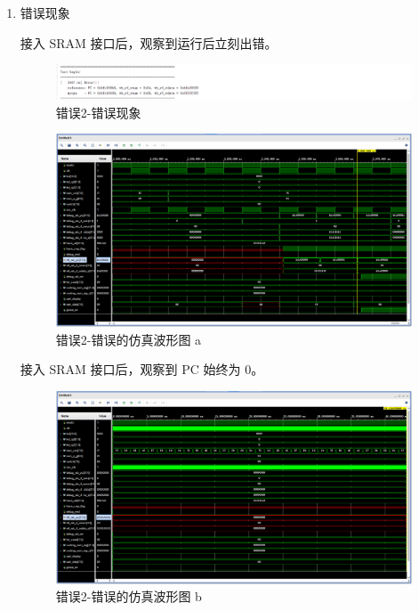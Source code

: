 \begin{enumerate}[(1)]
    \item 错误现象

接入 SRAM 接口后，观察到运行后立刻出错。

\begin{figure}[H]
    \centering
    \includegraphics[width=\textwidth]{image/错误2-错误现象1.png}
    \caption{错误2-错误现象}
    \label{fig:错误2-错误现象1}
\end{figure}

\begin{figure}[H]
    \centering
    \includegraphics[width=\textwidth]{image/错误2-错误现象2.png}
    \caption{错误2-错误的仿真波形图 a}
    \label{fig:错误2-错误现象2}
\end{figure}

接入 SRAM 接口后，观察到 PC 始终为 0。

\begin{figure}[H]
    \centering
    \includegraphics[width=\textwidth]{image/错误2-错误现象3.png}
    \caption{错误2-错误的仿真波形图 b}
    \label{fig:错误2-错误现象3}
\end{figure}


\end{enumerate}
